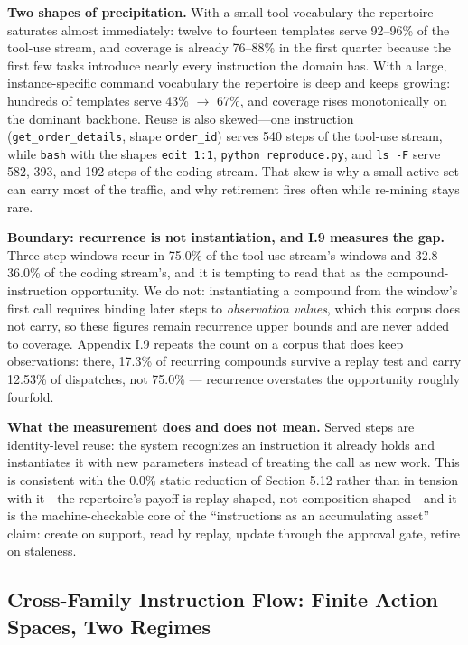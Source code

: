 \documentclass[
  11pt,
]{article}
\begin{document}
\textbf{Two shapes of precipitation.} With a small tool vocabulary the
repertoire saturates almost immediately: twelve to fourteen templates
serve 92--96\% of the tool-use stream, and coverage is already 76--88\%
in the first quarter because the first few tasks introduce nearly every
instruction the domain has. With a large, instance-specific command
vocabulary the repertoire is deep and keeps growing: hundreds of
templates serve 43\% \(\rightarrow\) 67\%, and coverage rises
monotonically on the dominant backbone. Reuse is also skewed---one
instruction (\texttt{get\_order\_details}, shape \texttt{order\_id})
serves 540 steps of the tool-use stream, while \texttt{bash} with the
shapes \texttt{edit\ 1:1}, \texttt{python\ reproduce.py}, and
\texttt{ls\ -F} serve 582, 393, and 192 steps of the coding stream. That
skew is why a small active set can carry most of the traffic, and why
retirement fires often while re-mining stays rare.

\textbf{Boundary: recurrence is not instantiation, and I.9 measures the
gap.} Three-step windows recur in 75.0\% of the tool-use stream's
windows and 32.8--36.0\% of the coding stream's, and it is tempting to
read that as the compound-instruction opportunity. We do not:
instantiating a compound from the window's first call requires binding
later steps to \emph{observation values}, which this corpus does not
carry, so these figures remain recurrence upper bounds and are never
added to coverage. Appendix I.9 repeats the count on a corpus that does
keep observations: there, 17.3\% of recurring compounds survive a replay
test and carry 12.53\% of dispatches, not 75.0\% --- recurrence
overstates the opportunity roughly fourfold.

\textbf{What the measurement does and does not mean.} Served steps are
identity-level reuse: the system recognizes an instruction it already
holds and instantiates it with new parameters instead of treating the
call as new work. This is consistent with the 0.0\% static reduction of
Section 5.12 rather than in tension with it---the repertoire's payoff is
replay-shaped, not composition-shaped---and it is the machine-checkable
core of the ``instructions as an accumulating asset'' claim: create on
support, read by replay, update through the approval gate, retire on
staleness.

\subsection{Cross-Family Instruction Flow: Finite Action Spaces, Two
Regimes}\label{cross-family-instruction-flow-finite-action-spaces-two-regimes}
\end{document}
